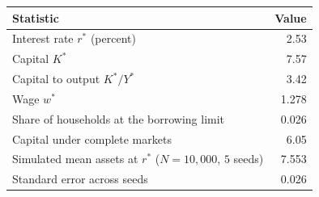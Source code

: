 \begin{tabular}{lr}
\toprule
Statistic & Value \\
\midrule
Interest rate $r^*$ (percent) & 2.53 \\
Capital $K^*$ & 7.57 \\
Capital to output $K^* / Y^*$ & 3.42 \\
Wage $w^*$ & 1.278 \\
Share of households at the borrowing limit & 0.026 \\
Capital under complete markets & 6.05 \\
Simulated mean assets at $r^*$ ($N = 10{,}000$, $5$ seeds) & 7.553 \\
Standard error across seeds & 0.026 \\
\bottomrule
\end{tabular}
